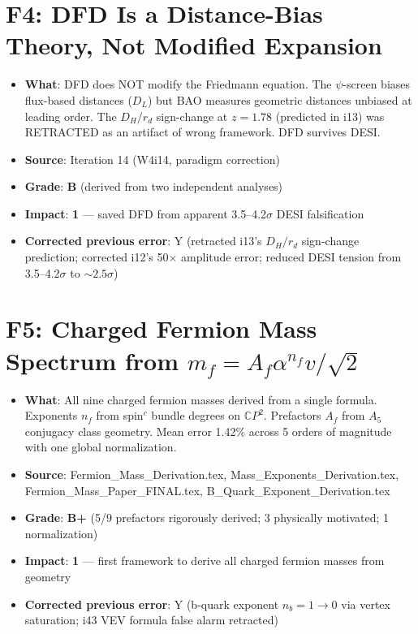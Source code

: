 \documentclass[11pt,a4paper]{article}
\newcommand{\grade}[1]{\textbf{#1}}
\newcommand{\impact}[1]{\textbf{#1}}
\begin{document}
\section{F4: DFD Is a Distance-Bias Theory, Not Modified Expansion}
\begin{itemize}[nosep]
\item \textbf{What}: DFD does NOT modify the Friedmann equation. The $\psi$-screen biases flux-based distances ($D_L$) but BAO measures geometric distances unbiased at leading order. The $D_H/r_d$ sign-change at $z=1.78$ (predicted in i13) was RETRACTED as an artifact of wrong framework. DFD survives DESI.
\item \textbf{Source}: Iteration 14 (W4i14, paradigm correction)
\item \textbf{Grade}: \grade{B} (derived from two independent analyses)
\item \textbf{Impact}: \impact{1} --- saved DFD from apparent 3.5--4.2$\sigma$ DESI falsification
\item \textbf{Corrected previous error}: Y (retracted i13's $D_H/r_d$ sign-change prediction; corrected i12's 50$\times$ amplitude error; reduced DESI tension from 3.5--4.2$\sigma$ to $\sim 2.5\sigma$)
\end{itemize}

\section{F5: Charged Fermion Mass Spectrum from $m_f = A_f \alpha^{n_f} v/\sqrt{2}$}
\begin{itemize}[nosep]
\item \textbf{What}: All nine charged fermion masses derived from a single formula. Exponents $n_f$ from spin$^c$ bundle degrees on $\mathbb{C}P^2$. Prefactors $A_f$ from $A_5$ conjugacy class geometry. Mean error 1.42\% across 5 orders of magnitude with one global normalization.
\item \textbf{Source}: Fermion\_Mass\_Derivation.tex, Mass\_Exponents\_Derivation.tex, Fermion\_Mass\_Paper\_FINAL.tex, B\_Quark\_Exponent\_Derivation.tex
\item \textbf{Grade}: \grade{B+} (5/9 prefactors rigorously derived; 3 physically motivated; 1 normalization)
\item \textbf{Impact}: \impact{1} --- first framework to derive all charged fermion masses from geometry
\item \textbf{Corrected previous error}: Y (b-quark exponent $n_b = 1 \to 0$ via vertex saturation; i43 VEV formula false alarm retracted)
\end{itemize}
\end{document}
